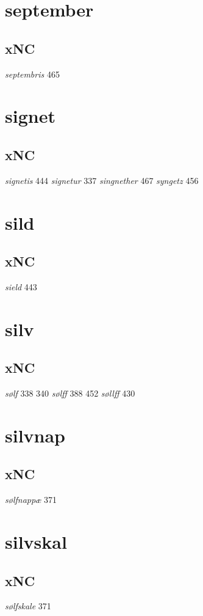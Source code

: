 \documentclass[a4paper,twocolumn]{article}
\begin{document}
\section{september}
\label{sec:orgf9b937c}
\subsection{xNC}
\label{sec:orgcbf7e4a}
\emph{septembris} 465 
\section{signet}
\label{sec:org0bb17e2}
\subsection{xNC}
\label{sec:orgf8dd423}
\emph{signetis} 444 \emph{signetur} 337 \emph{singnether} 467 \emph{syngetz} 456 
\section{sild}
\label{sec:orga10ced4}
\subsection{xNC}
\label{sec:org3c6b256}
\emph{sield} 443 
\section{silv}
\label{sec:org04fff6e}
\subsection{xNC}
\label{sec:org5f8f08f}
\emph{sølf} 338 340 \emph{sølff} 388 452 \emph{søllff} 430 
\section{silvnap}
\label{sec:org95ea061}
\subsection{xNC}
\label{sec:orgbc36367}
\emph{sølfnappæ} 371 
\section{silvskal}
\label{sec:org48193eb}
\subsection{xNC}
\label{sec:orgafe9930}
\emph{sølfskale} 371 
\end{document}
